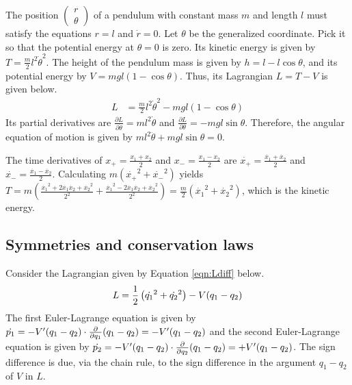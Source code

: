 \begin{answer}\label{ans:pendulum}
	The position $\begin{pmatrix} r \\ \theta \end{pmatrix}$ of a pendulum with constant mass $m$ and length $l$ must satisfy the equations $r=l$ and $\dot{r} = 0$.
	Let $\theta$ be the generalized coordinate.
	Pick it so that the potential energy at $\theta=0$ is zero.
	Its kinetic energy is given by $T = \frac{m}{2} l^2 \dot{\theta}^2$.
	The height of the pendulum mass is given by $h = l - l \cos \theta$, and its potential energy by $V = mgl\left(1 - \cos \theta\right)$.
	Thus, its Lagrangian $L = T - V$ is given below.
	\begin{align}\label{eqn:Lpend}
		L & = \frac{m}{2} l^2 \dot{\theta}^2 - mgl\left(1 - \cos \theta\right)
	\end{align}
	Its partial derivatives are $\frac{\partial L}{\partial \dot{\theta}} = m l^2 \dot{\theta}$ and $\frac{\partial L}{\partial \theta} = - m g l \sin \theta$.
	Therefore, the angular equation of motion is given by $m l^2 \ddot{\theta} + m g l \sin \theta = 0$.
\end{answer}

\begin{answer}
	The time derivatives of $x_+ = \frac{x_1 + x_2}{2}$ and $x_- = \frac{x_1 - x_2}{2}$ are $\dot{x_+} = \frac{\dot{x_1} + \dot{x_2}}{2}$ and $\dot{x_-} = \frac{\dot{x_1} - \dot{x_2}}{2}$.
	Calculating $m\left(\dot{x_+}^2 + \dot{x_-}^2\right)$ yields $T = m \left(\frac{\dot{x_1}^2 + 2\dot{x_1}\dot{x_2} + \dot{x_2}^2}{2^2} + \frac{\dot{x_1}^2 - 2\dot{x_1}\dot{x_2} + \dot{x_2}^2}{2^2}\right) = \frac{m}{2}\left(\dot{x_1}^2 + \dot{x_2}^2\right)$, which is the kinetic energy.
\end{answer}

\subsection{Symmetries and conservation laws}

\begin{answer}
	Consider the Lagrangian given by Equation \eqref{eqn:Ldiff} below.
	\begin{align}\label{eqn:Ldiff}
		L = \frac{1}{2}\left(\dot{q_1}^2 + \dot{q_2}^2\right) - V\!\left(q_1 - q_2\right)
	\end{align}
	The first Euler-Lagrange equation is given by $\dot{p_1} = -V'(q_1-q_2) \cdot \frac{\partial}{\partial q_1}\!\left(q_1-q_2\right) = - V'(q_1-q_2)$ and the second Euler-Lagrange equation is given by $\dot{p_2} = - V'(q_1-q_2) \cdot \frac{\partial}{\partial q_2}\!\left(q_1-q_2\right) = + V'(q_1-q_2)$.
	The sign difference is due, via the chain rule, to the sign difference in the argument $q_1-q_2$ of $V$ in $L$.
\end{answer}

